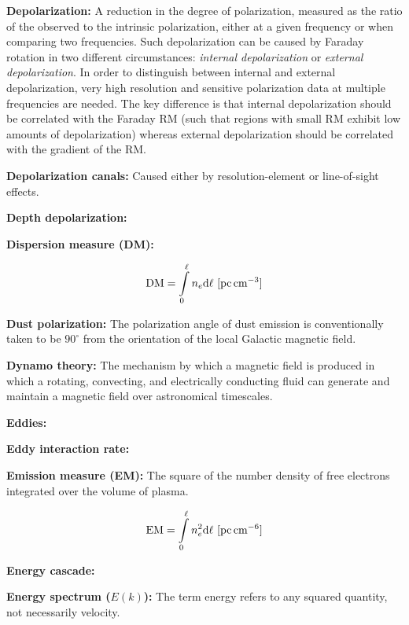 \documentclass[a4paper,11pt]{article}
\begin{document}
{\noindent}\textbf{Depolarization:} A reduction in the degree of polarization, measured as the ratio of the observed to the intrinsic polarization, either at a given frequency or when comparing two frequencies. Such depolarization can be caused by Faraday rotation in two different circumstances: \textit{internal depolarization} or \textit{external depolarization}. In order to distinguish between internal and external depolarization, very high resolution and sensitive polarization data at multiple frequencies are needed. The key difference is that internal depolarization should be correlated with the Faraday RM (such that regions with small RM exhibit low amounts of depolarization) whereas external depolarization should be correlated with the gradient of the RM.

{\noindent}\textbf{Depolarization canals:} Caused either by resolution-element or line-of-sight effects.

{\noindent}\textbf{Depth depolarization:}

{\noindent}\textbf{Dispersion measure (DM):}

\begin{align*}
    {\rm DM} = \int\limits_0^\ell n_e\mathrm{d}\ell ~ [{\rm pc\,cm^{-3}}]
\end{align*}

{\noindent}\textbf{Dust polarization:} The polarization angle of dust emission is conventionally taken to be $90^\circ$ from the orientation of the local Galactic magnetic field.

{\noindent}\textbf{Dynamo theory:} The mechanism by which a magnetic field is produced in which a rotating, convecting, and electrically conducting fluid can generate and maintain a magnetic field over astronomical timescales. 

{\noindent}\textbf{Eddies:}

{\noindent}\textbf{Eddy interaction rate:}

{\noindent}\textbf{Emission measure (EM):} The square of the number density of free electrons integrated over the volume of plasma.

\begin{align*}
    {\rm EM} = \int\limits_0^\ell n_e^2\mathrm{d}\ell ~ [{\rm pc\,cm^{-6}}]
\end{align*}

{\noindent}\textbf{Energy cascade:}

{\noindent}\textbf{Energy spectrum ($E(k)$):} The term energy refers to any squared quantity, not necessarily velocity.
\end{document}

